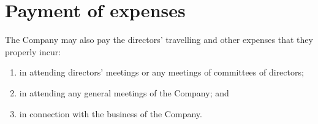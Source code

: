 \section{Payment of expenses}

The Company may also pay the directors' travelling and other expenses that they properly incur:

\begin{enumerate}[label=(\alph*)]
    \item in attending directors' meetings or any meetings of committees of directors;
    \item in attending any general meetings of the Company; and
    \item in connection with the business of the Company.
\end{enumerate} 